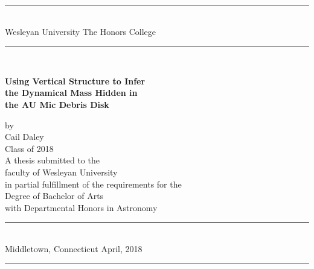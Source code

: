 \pagestyle{empty}
\begin{titlepage}
\begin{center}
\rule{5.75in}{1pt} \\
\vspace*{-0.125in}
{\large \doublespacing Wesleyan University} \hfill {\large \doublespacing The Honors College}
\rule[0.2in]{5.75in}{1pt} \\
\vspace*{0.8in}

{\LARGE \singlespacing \bf 
  Using Vertical Structure to Infer \\
  the Dynamical Mass Hidden in \\
  the AU Mic Debris Disk
  } \\
\vspace*{0.05in}
\vspace*{0.10in}

{\large \vspace*{0.20in}  \singlespacing by \vspace*{.2in}
\\Cail Daley \\ Class of 2018\\}
\vspace*{0.25in}
\vspace*{0.8in}
{\large \singlespacing A thesis submitted to the\\ faculty of Wesleyan University\\ in partial fulfillment of the requirements for the \\ Degree of Bachelor of Arts\\ with Departmental Honors in Astronomy\\ \vspace*{-0.15in} }
\vspace*{.25in}
\rule{5.75in}{1pt} \\
\vspace*{-0.125in}
{\large \doublespacing Middletown, Connecticut \hfill April, 2018}
\rule[0.2in]{5.75in}{1pt} 
\end{center}
\end{titlepage}

